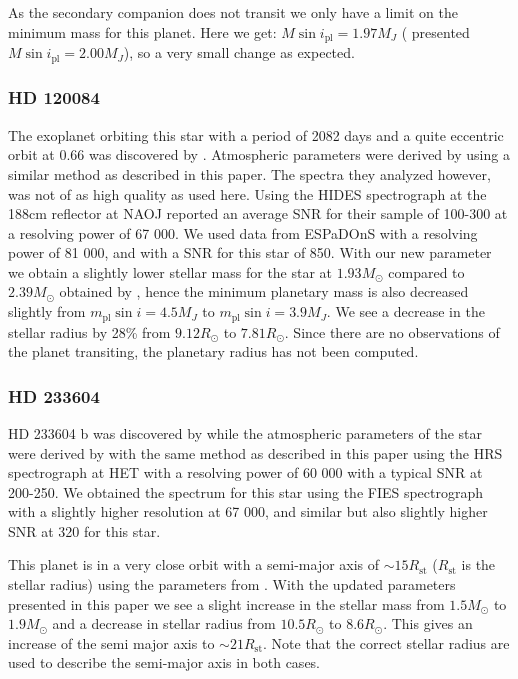 \documentclass{aa}
\begin{document}
As the secondary companion does not transit we only have a limit on the minimum
mass for this planet. Here we get: $M\sin i_\mathrm{pl} = 1.97M_J$
(\citet{Hartmann2014} presented $M\sin i_\mathrm{pl} = 2.00M_J$), so a very
small change as expected.


\subsubsection{HD 120084}
\label{sub:HD_120084}
The exoplanet orbiting this star with a period of 2082 days and a quite
eccentric orbit at 0.66 was discovered by \citet{Sato2013}. Atmospheric
parameters were derived by \citet{Takeda2008} using a similar method as
described in this paper. The spectra they analyzed however, was not of as high
quality as used here. Using the HIDES spectrograph at the 188cm reflector at
NAOJ \citet{Takeda2008} reported an average SNR for their sample of 100-300 at a
resolving power of 67 000. We used data from ESPaDOnS with a resolving power of
81 000, and with a SNR for this star of 850. With our new parameter we obtain a
slightly lower stellar mass for the star at $1.93M_\odot$ compared to
$2.39M_\odot$ obtained by \cite{Takeda2008}, hence the minimum planetary mass is
also decreased slightly from $m_\mathrm{pl}\sin i=4.5M_J$ to $m_\mathrm{pl}\sin
i=3.9M_J$. We see a decrease in the stellar radius by 28\% from $9.12R_\odot$ to
$7.81R_\odot$. Since there are no observations of the planet transiting, the
planetary radius has not been computed.


\subsubsection{HD 233604}
\label{sub:HD_233604}
HD 233604 b was discovered by \citet{Nowak2013} while the atmospheric parameters
of the star were derived by \citet{Zielinski2012} with the same method as
described in this paper using the HRS spectrograph at HET with a resolving power
of 60 000 with a typical SNR at 200-250. We obtained the spectrum for this star
using the FIES spectrograph with a slightly higher resolution at 67 000, and
similar but also slightly higher SNR at 320 for this star.

This planet is in a very close orbit with a semi-major axis of $\sim
15R_\mathrm{st}$ ($R_\mathrm{st}$ is the stellar radius) using the parameters
from \citet{Nowak2013}. With the updated parameters presented in this paper we
see a slight increase in the stellar mass from $1.5M_\odot$ to $1.9M_\odot$ and
a decrease in stellar radius from $10.5R_\odot$ to $8.6R_\odot$. This gives an
increase of the semi major axis to $\sim 21R_\mathrm{st}$. Note that the correct
stellar radius are used to describe the semi-major axis in both cases.
\end{document}
